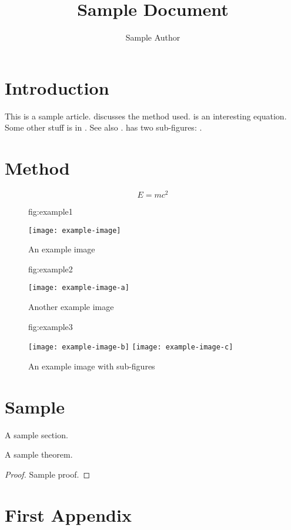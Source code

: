 \documentclass{article}
\title{Sample Document}
\author{Sample Author}
\begin{document}
\maketitle

\begin{abstract}
\lipsum[1]
\end{abstract}

\section{Introduction}

This is a sample article.  discusses
the method used.  is an interesting
equation. Some other stuff is in .
See also .
 has two sub-figures:
.

\lipsum[1]

\section{Method}\label{sec:method}

\lipsum[2]

\begin{equation}\label{eq:emc2}
E = mc^{2}
\end{equation}

\lipsum[3]

\begin{figure}
\floatconts
 {fig:example1}%
 {\caption{An example image}}%
 {\texttt{[image: example-image]}}%
\end{figure}

\begin{figure}
\floatconts
 {fig:example2}%
 {\caption{Another example image}}%
 {\texttt{[image: example-image-a]}}%
\end{figure}

\begin{figure}
\floatconts
 {fig:example3}%
 {\caption{An example image with sub-figures}}%
 {%
  \subfigure
   {\label{fig:sub-a}\texttt{[image: example-image-b]}}%
  \quad
  \subfigure
   {\label{fig:sub-b}\texttt{[image: example-image-c]}}%
 }
\end{figure}


\section{Sample}
A sample section.

\begin{theorem}
A sample theorem.
\begin{proof}
Sample proof.
\end{proof}
\end{theorem}

\appendix
\section{First Appendix}\label{apd:first}

\lipsum
\end{document}
